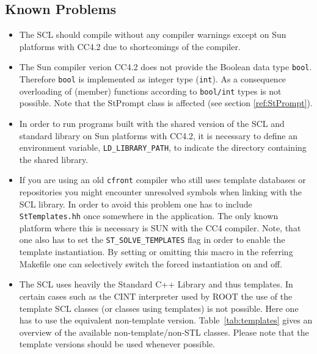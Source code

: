 \documentclass[twoside]{article}
\newcommand{\name}[1]{\textsf{#1}}%
\newcommand{\comp}[1]{\texttt{#1}}%
\begin{document}
\begin{description}
\section{Known Problems} 

\begin{itemize}
\item The SCL should compile without any compiler warnings except on
    \name{Sun}  platforms with CC4.2 due to shortcomings of
    the compiler.
\item The \name{Sun} compiler verion CC4.2 does not provide the
    Boolean data type \comp{bool}.  Therefore \comp{bool}
    is implemented as integer type (\comp{int}).  As a consequence
    overloading of (member) functions according to \comp{bool/int}
    types is not possible. Note that the StPrompt 
    class is affected (see section \ref{ref:StPrompt}).
\item In order to run programs built with the shared version of the
    SCL and standard library on Sun platforms with CC4.2, it is
    necessary to define an environment variable,
    \comp{LD\_LIBRARY\_PATH}, to indicate the
    directory containing the shared library.
\item If you are using an old \texttt{cfront} compiler  who still uses template databases or repositories
    you might encounter unresolved symbols when linking with the SCL
    library.  In order to avoid this problem one has to include
    \comp{StTemplates.hh} once somewhere in the
    application. The only known platform where this is necessary is
    SUN with the CC4 compiler. Note, that one also has to set the
    \comp{ST\_SOLVE\_TEMPLATES} flag in order to enable the template
    instantiation.  By setting or omitting this macro in the referring
    Makefile one can selectively switch the forced instantiation on
    and off.
\item The SCL uses heavily the Standard C++ Library and thus
    templates. In certain cases such as the CINT 
    interpreter used by ROOT  the use of the template SCL
    classes (or classes using templates) is not possible.  Here one
    has to use the equivalent non-template version.
    Table~\ref{tab:templates} gives an overview of the available
    non-template/non-STL classes. Please note that the template
    versions should be used whenever possible.
\end{itemize}
\begin{table}[htb]

\end{table}
\end{description}
\end{document}
